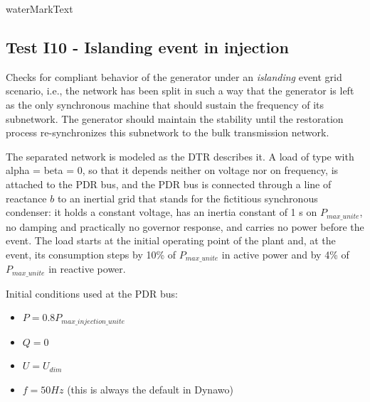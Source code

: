     {{ waterMarkText }}

    \renewcommand{\DTRPcs}{Islanding} %
    \renewcommand{\PCSname}{PCS_RTE-I16z3}
    \renewcommand{\OCname}{DeltaP10DeltaQ4Injection}


    \subsection{Test I10 - Islanding event in injection}

    Checks for compliant behavior of the generator under an
    \emph{islanding} event grid scenario, i.e., the network has been split in
    such a way that the generator is left as the only synchronous machine
    that should sustain the frequency of its subnetwork. The generator
    should maintain the stability until the restoration process
    re-synchronizes this subnetwork to the bulk transmission network.

    \GridCircuitZthree

    The separated network is modeled as the DTR describes it. A load of type
     with alpha = beta = 0, so that it depends neither on
    voltage nor on frequency, is attached to the PDR bus, and the PDR bus is
    connected through a line of reactance $b$ to an inertial grid that stands
    for the fictitious synchronous condenser: it holds a constant voltage, has
    an inertia constant of 1 s on $P_{max\_unite}$, no damping and practically
    no governor response, and carries no power before the event. The load
    starts at the initial operating point of the plant and, at the event, its
    consumption steps by 10\% of $P_{max\_unite}$ in active power and by 4\%
    of $P_{max\_unite}$ in reactive power.

    \begin{description}
        \item Initial conditions used at the PDR bus:
        \begin{itemize}
            \item $P = 0.8 P_{max\_injection\_unite}$
            \item $Q = 0$
            \item $U = U_{dim}$
            \item $f = 50 Hz$ (this is always the default in Dynawo)
        \end{itemize}
    \end{description}

